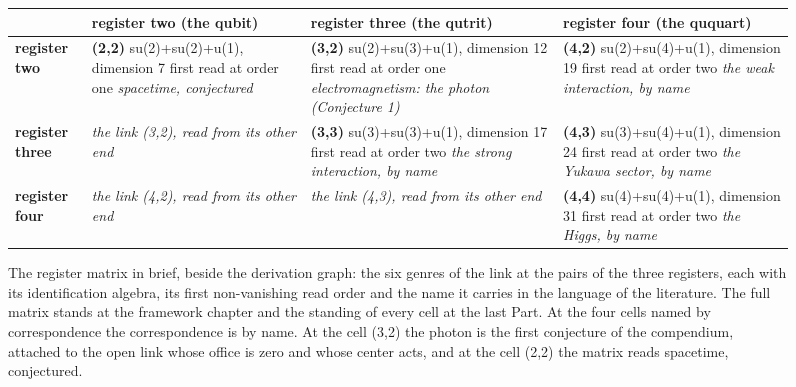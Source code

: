 \begin{figure}[htbp]\centering
\footnotesize
\setlength{\tabcolsep}{3pt}
\begin{adjustbox}{max width=\linewidth}\begin{tabular}{|p{14mm}|p{44mm}|p{44mm}|p{44mm}|}
\hline
 & \textbf{register two} (the qubit) & \textbf{register three} (the qutrit) & \textbf{register four} (the ququart) \\ \hline
\textbf{register two} & \textbf{(2,2)} \newline su(2)+su(2)+u(1), dimension 7 \newline first read at order one \newline \emph{spacetime, conjectured} & \textbf{(3,2)} \newline su(2)+su(3)+u(1), dimension 12 \newline first read at order one \newline \emph{electromagnetism: the photon (Conjecture 1)} & \textbf{(4,2)} \newline su(2)+su(4)+u(1), dimension 19 \newline first read at order two \newline \emph{the weak interaction, by name} \\ \hline
\textbf{register three} & \emph{the link (3,2), read from its other end} & \textbf{(3,3)} \newline su(3)+su(3)+u(1), dimension 17 \newline first read at order two \newline \emph{the strong interaction, by name} & \textbf{(4,3)} \newline su(3)+su(4)+u(1), dimension 24 \newline first read at order two \newline \emph{the Yukawa sector, by name} \\ \hline
\textbf{register four} & \emph{the link (4,2), read from its other end} & \emph{the link (4,3), read from its other end} & \textbf{(4,4)} \newline su(4)+su(4)+u(1), dimension 31 \newline first read at order two \newline \emph{the Higgs, by name} \\ \hline
\end{tabular}\end{adjustbox}
\caption{The register matrix in brief, beside the derivation graph: the six genres of the link at the pairs of the three registers, each with its identification algebra, its first non-vanishing read order and the name it carries in the language of the literature. The full matrix stands at the framework chapter and the standing of every cell at the last Part. At the four cells named by correspondence the correspondence is by name. At the cell (3,2) the photon is the first conjecture of the compendium, attached to the open link whose office is zero and whose center acts, and at the cell (2,2) the matrix reads spacetime, conjectured.}\label{fig:register-matrix-front}
\end{figure}
